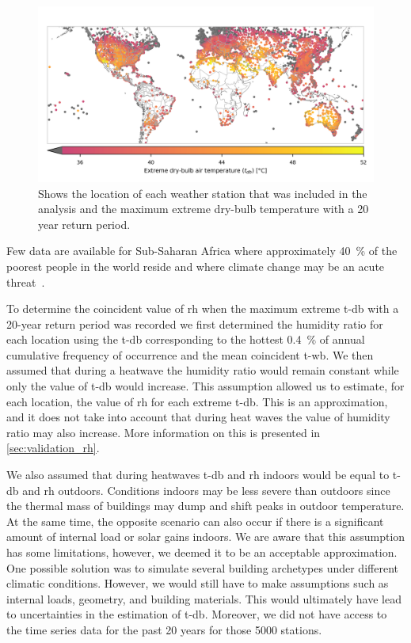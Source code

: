 \begin{figure}[hbt!]
    \centering
    \includegraphics[width=\textwidth]{figures/world-map}
    \caption{Shows the location of each weather station that was included in the analysis and the maximum extreme dry-bulb temperature with a 20 year return period.}
    \label{fig:world-map}
\end{figure}

Few data are available for Sub-Saharan Africa where approximately 40~\% of the poorest people in the world reside and where climate change may be an acute threat~\cite{PovertyO1:online}.

To determine the coincident value of \ac{rh} when the maximum extreme \ac{t-db} with a 20-year return period was recorded we first determined the humidity ratio for each location using the \ac{t-db} corresponding to the hottest 0.4~\% of annual cumulative frequency of occurrence and the mean coincident \ac{t-wb}.
We then assumed that during a heatwave the humidity ratio would remain constant while only the value of \ac{t-db} would increase.
This assumption allowed us to estimate, for each location, the value of \ac{rh} for each extreme \ac{t-db}.
This is an approximation, and it does not take into account that during heat waves the value of humidity ratio may also increase.
More information on this is presented in \ref{sec:validation_rh}.

We also assumed that during heatwaves \ac{t-db} and \ac{rh} indoors would be equal to \ac{t-db} and \ac{rh} outdoors.
Conditions indoors may be less severe than outdoors since the thermal mass of buildings may dump and shift peaks in outdoor temperature.
At the same time, the opposite scenario can also occur if there is a significant amount of internal load or solar gains indoors.
We are aware that this assumption has some limitations, however, we deemed it to be an acceptable approximation.
One possible solution was to simulate several building archetypes under different climatic conditions.
However, we would still have to make assumptions such as internal loads, geometry, and building materials.
This would ultimately have lead to uncertainties in the estimation of \ac{t-db}.
Moreover, we did not have access to the time series data for the past 20 years for those 5000 stations.

